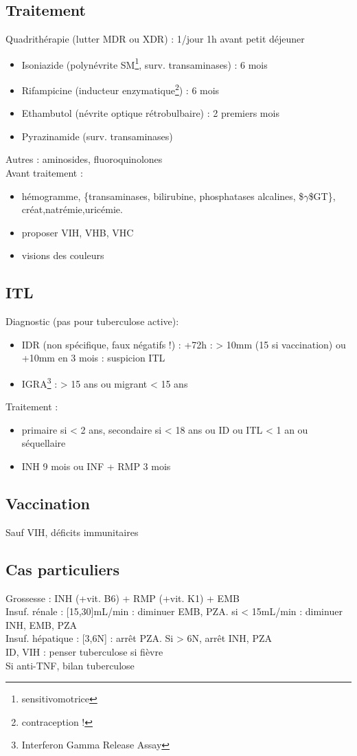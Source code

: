 \subsection{Traitement}
Quadrithérapie (lutter MDR ou XDR) : 1/jour 1h avant petit déjeuner
\begin{itemize}
\item Isoniazide (polynévrite SM\footnote{sensitivomotrice}, surv. transaminases) : 6 mois
\item Rifampicine (inducteur enzymatique\footnote{contraception !}) : 6 mois
\item Ethambutol (névrite optique rétrobulbaire) : 2 premiers mois
\item Pyrazinamide (surv. transaminases)
\end{itemize}
Autres : aminosides, fluoroquinolones \\
Avant traitement : 
\begin{itemize}
\item hémogramme, \{transaminases, bilirubine, phosphatases alcalines, \$\(\gamma\)\$GT\}, créat,natrémie,uricémie.
\item proposer VIH, VHB, VHC
\item visions des couleurs
\end{itemize}

\subsection{ITL}
Diagnostic (\danger pas pour tuberculose active): 
\begin{itemize}
\item IDR (non spécifique, faux négatifs !) : +72h : \diameter > 10mm (15 si vaccination) ou +10mm en 3 mois : suspicion ITL
\item IGRA\footnote{Interferon Gamma Release Assay} : > 15 ans ou migrant  < 15 ans
\end{itemize}
Traitement : 
\begin{itemize}
\item primaire si < 2 ans, secondaire si < 18 ans ou ID ou ITL < 1 an ou séquellaire
\item INH 9 mois ou INF + RMP 3 mois
\end{itemize}
\subsection{Vaccination}
Sauf VIH, déficits immunitaires
\subsection{Cas particuliers}
Grossesse : INH (+vit. B6) + RMP (+vit. K1) + EMB\\
Insuf. rénale : [15,30]mL/min : diminuer EMB, PZA. si < 15mL/min : diminuer INH, EMB, PZA\\
Insuf. hépatique : [3,6N] : arrêt PZA. Si > 6N, arrêt INH, PZA\\
ID, VIH : penser tuberculose si fièvre\\
Si anti-TNF, bilan tuberculose
